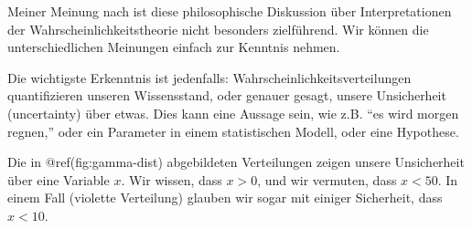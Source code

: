 \documentclass[]{tufte-handout}
\begin{document}
Meiner Meinung nach ist diese philosophische Diskussion über
Interpretationen der Wahrscheinlichkeitstheorie nicht besonders
zielführend. Wir können die unterschiedlichen Meinungen einfach zur
Kenntnis nehmen.

Die wichtigste Erkenntnis ist jedenfalls:
Wahrscheinlichkeitsverteilungen quantifizieren unseren Wissensstand,
oder genauer gesagt, unsere Unsicherheit (uncertainty) über etwas. Dies
kann eine Aussage sein, wie z.B. ``es wird morgen regnen,'' oder ein
Parameter in einem statistischen Modell, oder eine Hypothese.

Die in @ref(fig:gamma-dist) abgebildeten Verteilungen zeigen unsere
Unsicherheit über eine Variable \(x\). Wir wissen, dass \(x>0\), und wir
vermuten, dass \(x<50\). In einem Fall (violette Verteilung) glauben wir
sogar mit einiger Sicherheit, dass \(x<10\).
\end{document}
